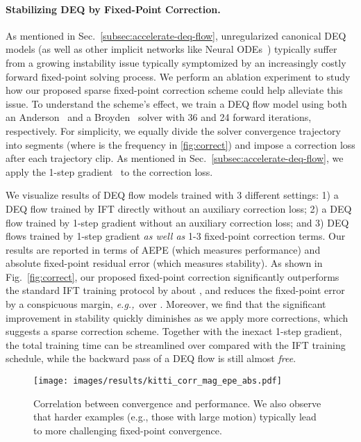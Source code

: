 \documentclass[10pt,twocolumn,letterpaper]{article}
\def\eg{\textit{e.g.,~}}
\begin{document}
\vspace{-0.3cm}
\paragraph{Stabilizing DEQ by Fixed-Point Correction.} As mentioned in Sec.~\ref{subsec:accelerate-deq-flow}, unregularized canonical DEQ models (as well as other implicit networks like Neural ODEs~\citep{chen2018neural}) typically suffer from a growing instability issue typically symptomized by an increasingly costly forward fixed-point solving process. We perform an ablation experiment to study how our proposed sparse fixed-point correction scheme could help alleviate this issue.
To understand the scheme's effect, we train a DEQ flow model using both an Anderson~\cite{anderson1965} and a Broyden~\cite{broyden1965class} solver with 36 and 24 forward iterations, respectively. For simplicity, we equally divide the solver convergence trajectory into  segments (where  is the frequency in \cref{fig:correct}) and impose a correction loss after each trajectory clip. As mentioned in Sec.~\ref{subsec:accelerate-deq-flow}, we apply the 1-step gradient~\citep{Ham,SamyFPN,PhantomGrad} to the correction loss. 

We visualize results of DEQ flow models trained with 3 different settings: 1) a DEQ flow trained by IFT directly without an auxiliary correction loss; 2) a DEQ flow trained by 1-step gradient without an auxiliary correction loss; and 3) DEQ flows trained by 1-step gradient \emph{as well as} 1-3 fixed-point correction terms. Our results are reported in terms of AEPE (which measures performance) and absolute fixed-point residual error  (which measures stability).
As shown in Fig.~\ref{fig:correct}, our proposed fixed-point correction significantly outperforms the standard IFT training protocol by about , and reduces the fixed-point error by a conspicuous margin, \eg over . Moreover, we find that the significant improvement in stability quickly diminishes as we apply more corrections, which suggests a sparse correction scheme.
Together with the inexact 1-step gradient, the total training time can be streamlined over  compared with the IFT training schedule, while the backward pass of a DEQ flow is still almost \textit{free}.

\begin{figure}
\label{fig:corr}
\centering
\texttt{[image: images/results/kitti\_corr\_mag\_epe\_abs.pdf]}
\vspace{-.4cm}
\caption{Correlation between convergence and performance. We also observe that harder examples (e.g., those with large motion) typically lead to more challenging fixed-point convergence.}
\vspace{-.4cm}
\end{figure}
\end{document}
